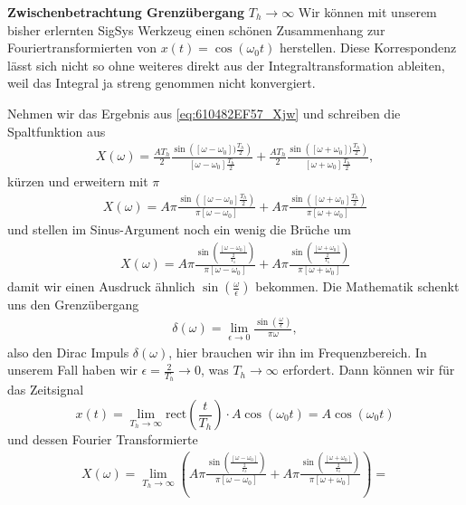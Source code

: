\begin{mdframed}
\textbf{Zwischenbetrachtung Grenzübergang} $T_h\to\infty$ Wir können mit
unserem bisher erlernten SigSys Werkzeug
einen schönen Zusammenhang zur Fouriertransformierten von $x(t)=\cos(\omega_0 t)$
herstellen.
Diese Korrespondenz lässt sich nicht so ohne weiteres direkt aus der Integraltransformation
ableiten, weil das Integral ja streng genommen nicht konvergiert.
%

Nehmen wir das Ergebnis aus \ref{eq:610482EF57_Xjw} und schreiben die Spaltfunktion
aus
\begin{align}
X(\omega) =
\frac{A T_h}{2} \frac{\sin\left([\omega-\omega_0]) \frac{T_h}{2}\right)}{[\omega-\omega_0] \frac{T_h}{2}} +
\frac{A T_h}{2} \frac{\sin\left([\omega+\omega_0]) \frac{T_h}{2}\right)}{[\omega+\omega_0] \frac{T_h}{2}},
\end{align}
kürzen und erweitern mit $\pi$
\begin{align}
X(\omega) =
A \pi \frac{\sin\left([\omega-\omega_0] \frac{T_h}{2}\right)}{\pi [\omega-\omega_0]} +
A \pi \frac{\sin\left([\omega+\omega_0] \frac{T_h}{2}\right)}{\pi [\omega+\omega_0]}
\end{align}
und stellen im Sinus-Argument noch ein wenig die Brüche um
\begin{align}
X(\omega) =
A \pi \frac{\sin\left( \frac{[\omega-\omega_0]}{\frac{2}{T_h}}  \right)}{\pi [\omega-\omega_0]} +
A \pi \frac{\sin\left( \frac{[\omega+\omega_0]}{\frac{2}{T_h}}  \right)}{\pi [\omega+\omega_0]}
\end{align}
damit wir einen Ausdruck ähnlich $\sin(\frac{\omega}{\epsilon})$ bekommen.
%
Die Mathematik schenkt uns den Grenzübergang
\begin{align}
\delta(\omega) = \lim_{\epsilon\to 0} \frac{\sin(\frac{\omega}{\epsilon})}{\pi \omega},
\end{align}
also den Dirac Impuls $\delta(\omega)$, hier brauchen wir ihn im Frequenzbereich.
%
In unserem Fall haben wir $\epsilon=\frac{2}{T_h} \to 0$, was $T_h\to \infty$
erfordert.
Dann können wir für das Zeitsignal
\begin{equation}
x(t) = \lim_{T_h\to\infty} \mathrm{rect}(\frac{t}{T_h}) \cdot A \cos(\omega_0 t) =
A \cos(\omega_0 t)
\end{equation}
und dessen Fourier Transformierte
\begin{align}
X(\omega) =
\lim_{T_h\to\infty}
\left(A \pi \frac{\sin\left( \frac{[\omega-\omega_0]}{\frac{2}{T_h}}  \right)}{\pi [\omega-\omega_0]} +
A \pi \frac{\sin\left( \frac{[\omega+\omega_0]}{\frac{2}{T_h}}  \right)}{\pi [\omega+\omega_0]} \right)=

\end{align}
\end{mdframed}
